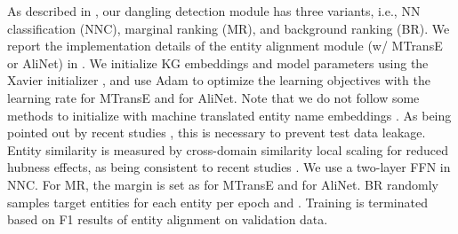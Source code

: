 \label{sec:config}
As described in , our dangling detection module has three variants, i.e., NN classification (NNC), marginal ranking (MR), and background ranking (BR). 
We report the implementation details of the entity alignment module (w/ MTransE or AliNet) in .
We initialize KG embeddings and model parameters using the Xavier initializer \cite{Xavier}, and use Adam \cite{Adam} to optimize the learning objectives with the learning rate  for MTransE and  for AliNet. 
Note that we do not follow some methods to initialize with machine translated entity name embeddings \cite{NMN_acl20}.
As being pointed out by recent studies \cite{JEANS,EVA,AttrGNN}, this is necessary to prevent test data leakage.
Entity similarity is measured by cross-domain similarity local scaling \cite{CSLS} for reduced hubness effects, as being consistent to recent studies \cite{AliNet,JEANS}.
We use a two-layer FFN in NNC. 
For MR, the margin is set as  for MTransE and  for AliNet.
BR randomly samples  target entities for each entity per epoch and .
Training is terminated based on F1 results of entity alignment on validation data.

